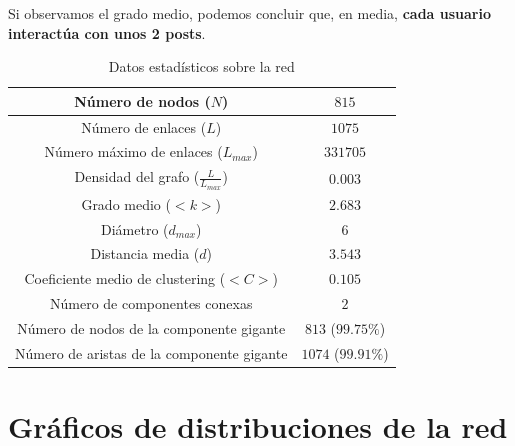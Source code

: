 \documentclass[10pt,a4paper,spanish]{article}
\numberwithin{equation}{section} %
\numberwithin{figure}{section} %
\numberwithin{table}{section} %
\begin{document}
Si observamos el grado medio, podemos concluir que, en media, \textbf{cada usuario interactúa con unos 2 posts}.

\begin{table}[!h]
\centering
\begin{tabular}{| c | c |}
\hline
Número de nodos ($N$) & $815$ \\
\hline
Número de enlaces ($L$) & $1075$ \\
\hline
Número máximo de enlaces ($L_{max}$) & $331705$ \\
\hline
Densidad del grafo ($\frac{L}{L_{max}}$) & $0.003$ \\
\hline
Grado medio ($<k>$) & $2.683$ \\
\hline
Diámetro ($d_{max}$) & $6$ \\
\hline
Distancia media ($d$) & $3.543$ \\
\hline
Coeficiente medio de clustering ($<C>$) & $0.105$ \\
\hline
Número de componentes conexas & $2$ \\
\hline
Número de nodos de la componente gigante & $813$ ($99.75\%$)\\
\hline
Número de aristas de la componente gigante & $1074$ ($99.91\%$)\\
\hline
\end{tabular}
\caption{Datos estadísticos sobre la red}
\label{tabla}
\end{table}

\section{Gráficos de distribuciones de la red}
\end{document}

